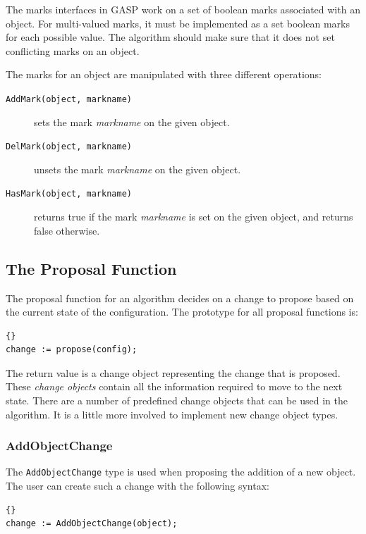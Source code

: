 The marks interfaces in GASP work on a set of boolean marks associated
with an object.  For multi-valued marks, it must be implemented as a
set boolean marks for each possible value.  The algorithm should make
sure that it does not set conflicting marks on an object.

The marks for an object are manipulated with three different
operations:

\begin{description}
\item[\texttt{AddMark(object, markname)}] sets the mark
\emph{markname} on the given object.
\item[\texttt{DelMark(object, markname)}] unsets the mark
\emph{markname} on the given object.
\item[\texttt{HasMark(object, markname)}] returns true if the mark
\emph{markname} is set on the given object, and returns false
otherwise.
\end{description}

\subsection{The Proposal Function}\label{sect:proposal-function-impl}

The proposal function for an algorithm decides on a change to propose
based on the current state of the configuration.  The prototype for
all proposal functions is:
\begin{lstlisting}{}
change := propose(config);
\end{lstlisting}

\noindent The return value is a change object representing the change
that is proposed.  These \emph{change objects} contain all the
information required to move to the next state.  There are a number of
predefined change objects that can be used in the algorithm.  It is a
little more involved to implement new change object types.

\subsubsection{AddObjectChange}

The \texttt{AddObjectChange} type is used when proposing the addition
of a new object.  The user can create such a change with the following
syntax:

\begin{lstlisting}{}
change := AddObjectChange(object);
\end{lstlisting}

